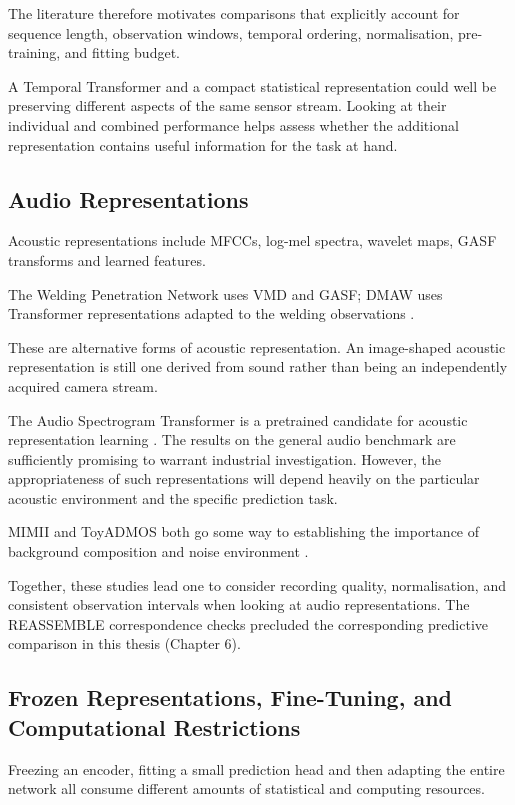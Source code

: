 The literature therefore motivates comparisons that explicitly account for sequence length,
observation windows, temporal ordering, normalisation, pre-training, and fitting budget.

A Temporal Transformer and a compact statistical representation could well be preserving different
aspects of the same sensor stream. Looking at their individual and combined performance helps assess
whether the additional representation contains useful information for the task at hand.

\subsection{Audio Representations}

Acoustic representations include MFCCs, log-mel spectra, wavelet maps, GASF transforms and learned
features.

The Welding Penetration Network uses VMD and GASF; DMAW uses Transformer representations adapted to
the welding observations \parencite{Hua2026Weld,P003}.

These are alternative forms of acoustic representation. An image-shaped acoustic representation is
still one derived from sound rather than being an independently acquired camera stream.

The Audio Spectrogram Transformer is a pretrained candidate for acoustic representation learning
\parencite{P011}. The results on the general audio benchmark are sufficiently promising to warrant
industrial investigation. However, the appropriateness of such representations will depend heavily
on the particular acoustic environment and the specific prediction task.

MIMII and ToyADMOS both go some way to establishing the importance of background composition and
noise environment \parencite{Purohit2019MIMII,Koizumi2019ToyADMOS}.

Together, these studies lead one to consider recording quality, normalisation, and consistent
observation intervals when looking at audio representations. The REASSEMBLE correspondence checks
precluded the corresponding predictive comparison in this thesis (Chapter 6).

\subsection{Frozen Representations, Fine-Tuning, and Computational Restrictions}

Freezing an encoder, fitting a small prediction head and then adapting the entire network all
consume different amounts of statistical and computing resources.

